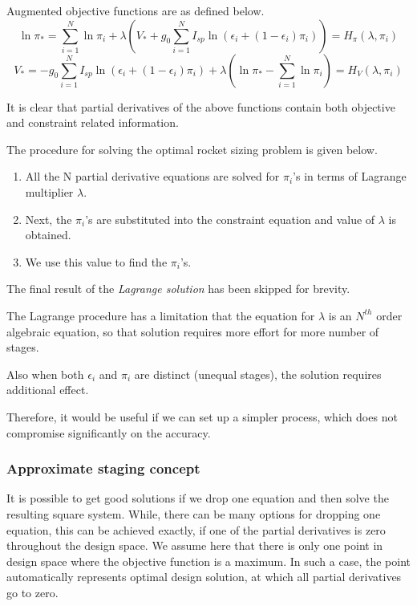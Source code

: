 \documentclass{article}
\theoremstyle{definition}
\begin{document}
Augmented objective functions are as defined below.
\begin{equation}
    \ln{\pi_*} = \sum_{i=1}^N \ln{\pi_i} + \lambda(V_* + g_0 \sum_{i=1}^N I_{sp} \ln{(\epsilon_i + (1 - \epsilon_i)\pi_i)}) = H_\pi(\lambda, \pi_i)
\end{equation}
\begin{equation}
    V_* = - g_0 \sum_{i=1}^N I_{sp} \ln{(\epsilon_i + (1 - \epsilon_i)\pi_i)} + \lambda(\ln{\pi_*} - \sum_{i=1}^N \ln{\pi_i}) = H_V(\lambda, \pi_i)
\end{equation}

It is clear that partial derivatives of the above functions contain both objective and constraint related information. \medskip

The procedure for solving the optimal rocket sizing problem is given below.

\begin{enumerate}
    \item All the N partial derivative equations are solved for $\pi_i$'s in terms of Lagrange multiplier $\lambda$.
    \item Next, the $\pi_i$'s are substituted into the constraint equation and value of $\lambda$ is obtained.
    \item We use this value to find the $\pi_i$'s.
\end{enumerate}

The final result of the \emph{Lagrange solution} has been skipped for brevity. \medskip

The Lagrange procedure has a limitation that the equation for $\lambda$ is an $N^{th}$ order algebraic equation, so that solution requires more effort for more number of stages.

Also when both $\epsilon_i$ and $\pi_i$ are distinct (unequal stages), the solution requires additional effect.

Therefore, it would be useful if we can set up a simpler process, which does not compromise significantly on the accuracy.

\subsubsection{Approximate staging concept}

It is possible to get good solutions if we drop one equation and then solve the resulting square system.
While, there can be many options for dropping one equation, this can be achieved exactly, if one of the partial derivatives is zero throughout the design space. 
We assume here that there is only one point in design space where the objective function is a maximum.
In such a case, the point automatically represents optimal design solution, at which all partial derivatives go to zero. \medskip
\end{document}
